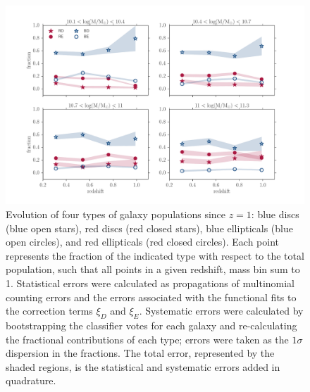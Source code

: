 \documentclass[useAMS,usenatbib]{mn2e}
\begin{document}
\begin{figure}
\centering
\includegraphics[width=\textwidth,trim={0cm 0cm 2cm 1cm},clip]{figures/morphologies_evolved.pdf}
\caption{Evolution of four types of galaxy populations since $z=1$: blue discs (blue open stars), red discs (red closed stars), blue ellipticals (blue open circles), and red ellipticals (red closed circles). Each point represents the fraction of the indicated type with respect to the total population, such that all points in a given redshift, mass bin sum to 1. Statistical errors were calculated as propagations of multinomial counting errors and the errors associated with the functional fits to the correction terms $\xi_D$ and $\xi_E$. Systematic errors were calculated by bootstrapping the classifier votes for each galaxy and re-calculating the fractional contributions of each type; errors were taken as the $1\sigma$ dispersion in the fractions. The total error, represented by the shaded regions, is the statistical and systematic errors added in quadrature.} 
\label{fig:all_plot}
\end{figure}
\end{document}
